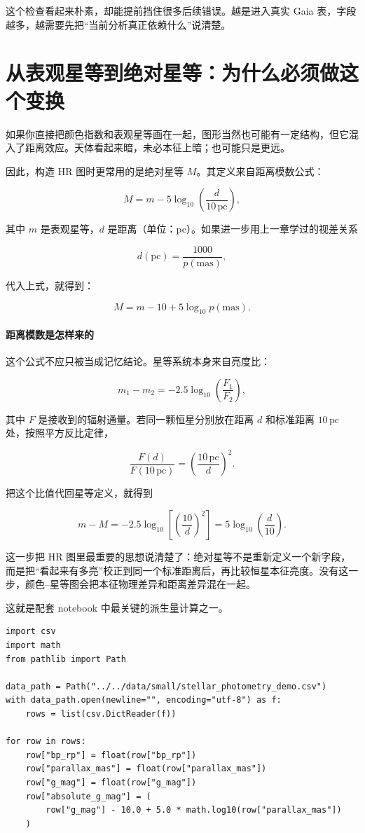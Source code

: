 这个检查看起来朴素，却能提前挡住很多后续错误。越是进入真实 Gaia 表，字段越多，越需要先把“当前分析真正依赖什么”说清楚。

\section{从表观星等到绝对星等：为什么必须做这个变换}

如果你直接把颜色指数和表观星等画在一起，图形当然也可能有一定结构，但它混入了距离效应。天体看起来暗，未必本征上暗；也可能只是更远。

因此，构造 HR 图时更常用的是绝对星等 $M$。其定义来自距离模数公式：

\[
M = m - 5\log_{10}\left(\frac{d}{10\,\mathrm{pc}}\right),
\]

其中 $m$ 是表观星等，$d$ 是距离（单位：pc）。如果进一步用上一章学过的视差关系

\[
d(\mathrm{pc}) = \frac{1000}{p(\mathrm{mas})},
\]

代入上式，就得到：

\[
M = m - 10 + 5\log_{10} p(\mathrm{mas}).
\]

\paragraph{距离模数是怎样来的}

这个公式不应只被当成记忆结论。星等系统本身来自亮度比：

\[
m_1 - m_2 = -2.5\log_{10}\left(\frac{F_1}{F_2}\right),
\]

其中 $F$ 是接收到的辐射通量。若同一颗恒星分别放在距离 $d$ 和标准距离 $10\,\mathrm{pc}$ 处，按照平方反比定律，

\[
\frac{F(d)}{F(10\,\mathrm{pc})}
= \left(\frac{10\,\mathrm{pc}}{d}\right)^2.
\]

把这个比值代回星等定义，就得到

\[
m - M
= -2.5\log_{10}\left[\left(\frac{10}{d}\right)^2\right]
= 5\log_{10}\left(\frac{d}{10}\right).
\]

这一步把 HR 图里最重要的思想说清楚了：绝对星等不是重新定义一个新字段，而是把“看起来有多亮”校正到同一个标准距离后，再比较恒星本征亮度。没有这一步，颜色--星等图会把本征物理差异和距离差异混在一起。

这就是配套 notebook 中最关键的派生量计算之一。

\begin{examplebox}[从星表字段计算绝对星等]
\begin{lstlisting}[style=pythonstyle]
import csv
import math
from pathlib import Path

data_path = Path("../../data/small/stellar_photometry_demo.csv")
with data_path.open(newline="", encoding="utf-8") as f:
    rows = list(csv.DictReader(f))

for row in rows:
    row["bp_rp"] = float(row["bp_rp"])
    row["parallax_mas"] = float(row["parallax_mas"])
    row["g_mag"] = float(row["g_mag"])
    row["absolute_g_mag"] = (
        row["g_mag"] - 10.0 + 5.0 * math.log10(row["parallax_mas"])
    )
\end{lstlisting}
\end{examplebox}

